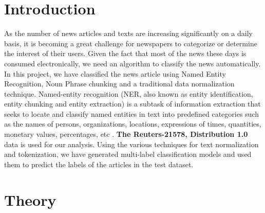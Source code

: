 \documentclass[fleqn,10pt]{SelfArx} %
\begin{document}
\flushbottom %

\maketitle %

\tableofcontents %

\thispagestyle{empty} %


\section*{Introduction} %
As the number of news articles and texts are increasing significantly on a daily basis, it is becoming a great challenge for newspapers to categorize or determine the interest of their users. Given the fact that most of the news these days is consumed electronically, we need an algorithm to classify the news automatically. In this project, we have classified the news article using Named Entity Recognition, Noun Phrase chunking and a traditional data normalization technique. Named-entity recognition (NER, also known as entity identification, entity chunking and entity extraction) is a subtask of information extraction that seeks to locate and classify named entities in text into predefined categories such as the names of persons, organizations, locations, expressions of times, quantities, monetary values, percentages, etc \cite{REF:1}. \textbf{The Reuters-21578, Distribution 1.0} data is used for our analysis.  Using the various techniques for text normalization and tokenization, we have generated multi-label classification models and used them to predict the labels of the articles in the test dataset.


\section{Theory}
\end{document}
